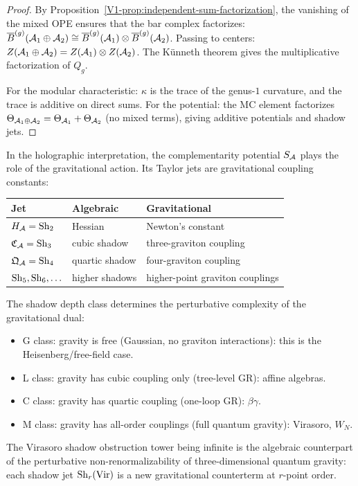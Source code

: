 \begin{proof}
By Proposition~\ref{V1-prop:independent-sum-factorization}, the
vanishing of the mixed OPE ensures that the bar complex
factorizes: $\overline{B}^{(g)}(\mathcal{A}_1 \oplus \mathcal{A}_2)
\cong \overline{B}^{(g)}(\mathcal{A}_1) \otimes \overline{B}^{(g)}(\mathcal{A}_2)$.
Passing to centers: $Z(\mathcal{A}_1 \oplus \mathcal{A}_2) = Z(\mathcal{A}_1)
\otimes Z(\mathcal{A}_2)$. The K\"{u}nneth theorem gives the
multiplicative factorization of $Q_g$.

For the modular characteristic: $\kappa$ is the trace of the
genus-$1$ curvature, and the trace is additive on direct sums.
For the potential: the MC element factorizes
$\Theta_{\mathcal{A}_1 \oplus \mathcal{A}_2} = \Theta_{\mathcal{A}_1} + \Theta_{\mathcal{A}_2}$
(no mixed terms), giving additive potentials and shadow jets.
\end{proof}

\begin{remark}
In the holographic interpretation, the complementarity
potential $S_{\mathcal{A}}$ plays the role of the gravitational action.
Its Taylor jets are gravitational coupling constants:
\begin{center}
\renewcommand{\arraystretch}{1.2}
\begin{tabular}{l@{\quad}l@{\quad}l}
\textbf{Jet} & \textbf{Algebraic} & \textbf{Gravitational} \\
\midrule
$H_{\mathcal{A}} = \mathrm{Sh}_2$ & Hessian & Newton's constant \\
$\mathfrak{C}_{\mathcal{A}} = \mathrm{Sh}_3$ & cubic shadow &
 three-graviton coupling \\
$\mathfrak{Q}_{\mathcal{A}} = \mathrm{Sh}_4$ & quartic shadow &
 four-graviton coupling \\
$\mathrm{Sh}_5, \mathrm{Sh}_6, \ldots$ & higher shadows &
 higher-point graviton couplings \\
\end{tabular}
\end{center}
The shadow depth class determines the perturbative
complexity of the gravitational dual:
\begin{itemize}
\item G class: gravity is free (Gaussian, no graviton
 interactions): this is the Heisenberg/free-field case.
\item L class: gravity has cubic coupling only (tree-level
 GR): affine algebras.
\item C class: gravity has quartic coupling (one-loop
 GR): $\beta\gamma$.
\item M class: gravity has all-order couplings (full quantum
 gravity): Virasoro, $W_N$.
\end{itemize}
The Virasoro shadow obstruction tower being infinite is the
algebraic counterpart of the perturbative non-renormalizability of
three-dimensional quantum gravity:
each shadow jet $\mathrm{Sh}_r(\mathrm{Vir})$ is a new
gravitational counterterm at $r$-point order.
\end{remark}

